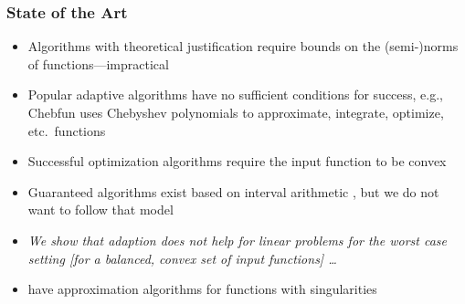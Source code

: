 \documentclass[12pt,compress,xcolor={usenames,dvipsnames}]{beamer} %
\begin{document}
\begin{frame}
	
\end{frame}

\begin{frame}
	\frametitle{State of the Art}
	
	\vspace{-3ex}
	
	\begin{itemize}
		\item Algorithms with \alert{theoretical justification} require bounds on the (semi-)norms of functions---impractical
		
		\item Popular adaptive algorithms have no sufficient conditions for success, e.g., \alert{Chebfun} \cite{TrefEtal16b} uses Chebyshev polynomials to approximate, integrate, optimize, etc.\ functions 
		
		\item Successful optimization algorithms require the input function to be \alert{convex}
		
		\item Guaranteed algorithms exist based on \alert{interval arithmetic} \cites{Rum99a, Rum10a}, but we do not want to follow that model
		
		\item \emph{We show that \alert{adaption does not help} for linear problems for the worst case setting [for a balanced, convex set of input functions] \ldots } \alert{\cite{Woz88a}}
		
    	\item {} have approximation algorithms for functions with \alert{singularities}
		
		
	\end{itemize}
\end{frame}

\end{document}
